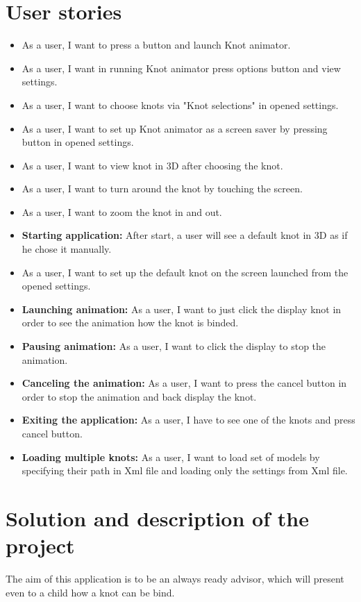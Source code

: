 \section*{User stories} %
\label{sec:User stories}
\begin{itemize}
  \item As a user, I want to press a button and launch Knot animator. 
  \item As a user, I want in running Knot animator press options button and view settings.
  \item As a user, I want to choose knots via "Knot selections" in opened settings.
  \item As a user, I want to set up Knot animator as a screen saver by pressing button in opened settings.
  \item As a user, I want to view knot in 3D after choosing the knot.
  \item As a user, I want to turn around the knot by touching the screen.
  \item As a user, I want to zoom the knot in and out.
  \item {\bf Starting application:} After start, a user will see a default knot in 3D as if he chose it manually.
  \item As a user, I want to set up the default knot on the screen launched from the opened settings.
  \item {\bf Launching animation:}  As a user, I want to just click the display knot in order to see the animation how the knot is binded.
  \item {\bf Pausing animation:} As a user, I want to click the display to stop the animation.
  \item {\bf Canceling the animation:} As a user, I want to press the cancel button in order to stop the animation and back display the knot.
  \item {\bf Exiting the application:} As a user, I have to see one of the knots and press cancel button. 
  \item {\bf Loading multiple knots:} As a user, I want to load set of models by specifying their path in Xml file and loading only the settings from Xml file.
\end{itemize}


\section*{Solution and description of the project} %
\label{sec:Solution}
The aim of this application is to be an always ready advisor, which will
present even to a child how a knot can be bind. 

